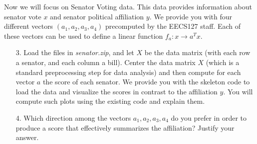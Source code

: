 \documentclass[11pt]{article}
\begin{document}
Now we will focus on Senator Voting data. This data provides information about senator vote $x$ and senator political affiliation $y$. We provide you with four different vectors $(a_1, a_2, a_3, a_4)$ precomputed by the EECS127 staff. Each of these vectors can be used to define a linear function $f_a: x \rightarrow a^Tx$.

\begin{enumerate}
    \item[3.] Load the files in \textit{senator.zip}, and let $X$ be the data matrix (with each row a senator, and each column a bill). Center the data matrix $X$ (which is a standard preprocessing step for data analysis) and then compute for each vector $a$ the score of each senator. We provide you with the skeleton code to load the data and visualize the scores in contrast to the affiliation $y$. You will compute such plots using the existing code and explain them.

    \item[4.] Which direction among the vectors $a_1, a_2, a_3, a_4$ do you prefer in order to produce a score that effectively summarizes the affiliation? Justify your answer.
\end{enumerate}
\end{document}
